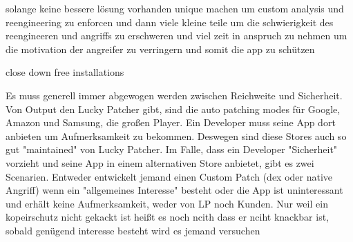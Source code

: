 solange keine bessere lösung vorhanden unique machen um custom analysis und reengineering zu enforcen und dann
viele kleine teile um die schwierigkeit des reengineeren und angriffs zu erschweren und viel zeit in anspruch zu nehmen um die motivation der angreifer zu verringern und somit die app zu schützen

close down free installations


Es muss generell immer abgewogen werden zwischen Reichweite und Sicherheit. Von Output den Lucky Patcher gibt, sind die auto patching modes für Google, Amazon und Samsung, die großen Player. Ein Developer muss seine App dort anbieten um Aufmerksamkeit zu bekommen. Deswegen sind diese Stores auch so gut "maintained" von Lucky Patcher.
Im Falle, dass ein Developer "Sicherheit" vorzieht und seine App in einem alternativen Store anbietet, gibt es zwei Scenarien. Entweder entwickelt jemand einen Custom Patch (dex oder native Angriff) wenn ein "allgemeines Interesse" besteht oder die App ist uninteressant und erhält keine Aufmerksamkeit, weder von LP noch Kunden.
Nur weil ein kopeirschutz nicht gekackt ist heißt es noch ncith dass er nciht knackbar ist, sobald genügend interesse besteht wird es jemand versuchen
